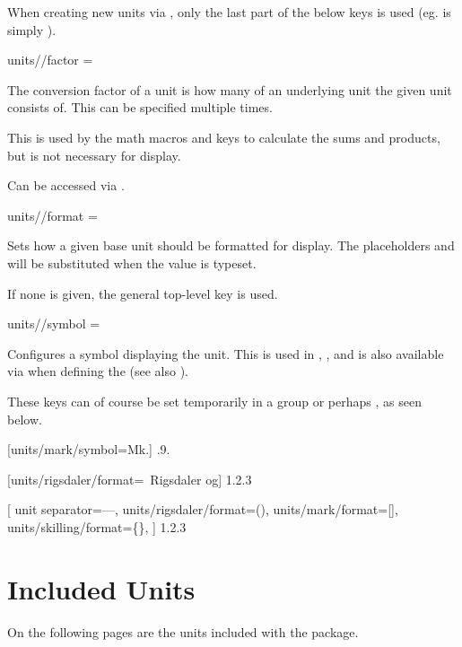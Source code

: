 \documentclass[
	a4paper,
]{article}
\begin{document}
When creating new units via , only the last part of the below keys is used (eg.  is simply ).

\begin{docKey}
	[]
	[doc label=units:factor]
	{units//factor}
	{= }
	{}
	
	The conversion factor of a unit is how many of an underlying unit the given unit consists of. This can be specified multiple times.
	
	This is used by the math macros and keys to calculate the sums and products, but is not necessary for display.
	
	Can be accessed via .
\end{docKey}

\begin{docKey}
	[]
	[doc label=units:format]
	{units//format}
	{=}
	{}

	Sets how a given base unit should be formatted for display. The placeholders  and  will be substituted when the value is typeset.

	If none is given, the general top-level  key is used.
\end{docKey}

\begin{docKey}
	[]
	[doc label=units:symbol]
	{units//symbol}
	{=}
	{}

	Configures a symbol displaying the unit. This is used in , , and is also available via  when defining the  (see also ).
\end{docKey}

These keys can of course be set temporarily in a group or perhaps , as seen below.

\begin{dispExample}
	[units/mark/symbol=Mk.]
	{.9.}

	[units/rigsdaler/format={\VALUE~Rigsdaler og}]
	{1.2.3}

[
		unit separator={---},
		units/rigsdaler/format={(\VALUE)},
		units/mark/format={[\VALUE]},
		units/skilling/format={\{\VALUE\}},
	]
	{1.2.3}
\end{dispExample}

\clearpage
\section{Included Units} %

\label{units:included}
On the following pages are the units included with the package.


\clearpage
{}


\printindex  %
\end{document}
